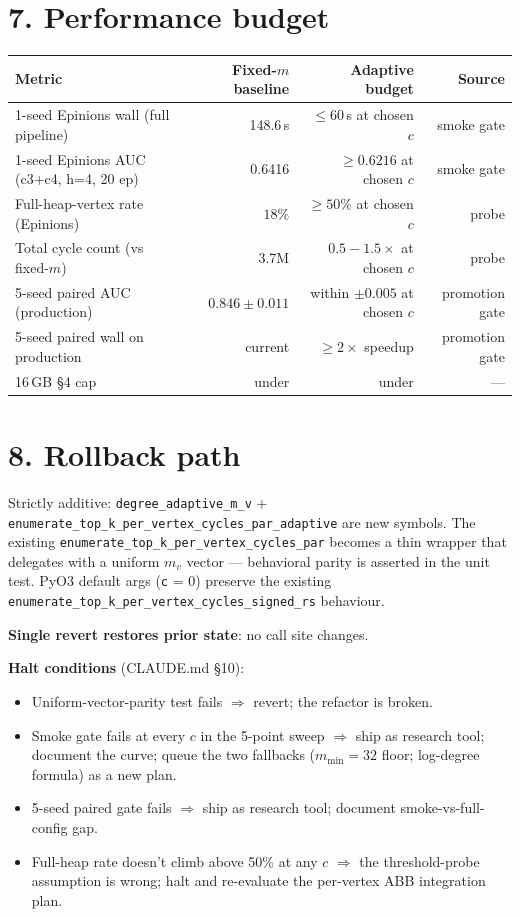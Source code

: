 \documentclass[a4paper,11pt]{article}
\begin{document}
\section*{7. Performance budget}

\begin{center}
\begin{tabular}{lrrr}
\toprule
Metric & Fixed-$m$ baseline & Adaptive budget & Source \\
\midrule
1-seed Epinions wall (full pipeline) & 148.6\,s & $\le 60$\,s at chosen $c$ & smoke gate \\
1-seed Epinions AUC (c3+c4, h=4, 20 ep) & 0.6416 & $\ge 0.6216$ at chosen $c$ & smoke gate \\
Full-heap-vertex rate (Epinions) & $18\%$ & $\ge 50\%$ at chosen $c$ & probe \\
Total cycle count (vs fixed-$m$) & 3.7M & $0.5{-}1.5\times$ at chosen $c$ & probe \\
5-seed paired AUC (production) & $0.846 \pm 0.011$ & within $\pm 0.005$ at chosen $c$ & promotion gate \\
5-seed paired wall on production & current & $\ge 2\times$ speedup & promotion gate \\
16\,GB \S4 cap & under & under & — \\
\bottomrule
\end{tabular}
\end{center}

\section*{8. Rollback path}

Strictly additive: \texttt{degree\_adaptive\_m\_v} +
\texttt{enumerate\_top\_k\_per\_vertex\_cycles\_par\_adaptive} are
new symbols.  The existing
\texttt{enumerate\_top\_k\_per\_vertex\_cycles\_par} becomes a thin
wrapper that delegates with a uniform $m_v$ vector — behavioral
parity is asserted in the unit test.  PyO3 default args
(\texttt{c} = 0) preserve the existing
\texttt{enumerate\_top\_k\_per\_vertex\_cycles\_signed\_rs}
behaviour.

\textbf{Single revert restores prior state}: no call site changes.

\textbf{Halt conditions} (CLAUDE.md \S10):

\begin{itemize}
  \item Uniform-vector-parity test fails $\Rightarrow$ revert; the
    refactor is broken.
  \item Smoke gate fails at every $c$ in the 5-point sweep
    $\Rightarrow$ ship as research tool; document the curve;
    queue the two fallbacks ($m_\text{min}=32$ floor; log-degree
    formula) as a new plan.
  \item 5-seed paired gate fails $\Rightarrow$ ship as research
    tool; document smoke-vs-full-config gap.
  \item Full-heap rate doesn't climb above 50\% at any $c$
    $\Rightarrow$ the threshold-probe assumption is wrong; halt and
    re-evaluate the per-vertex ABB integration plan.
\end{itemize}
\end{document}
